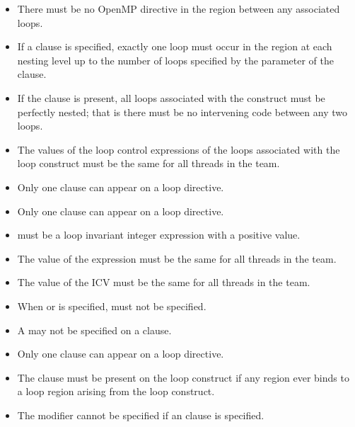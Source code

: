 \begin{itemize}
\item There must be no OpenMP directive in the region between any
associated loops.

\item If a  clause is specified, exactly one loop must
occur in the region at each nesting level up to the number of loops
specified by the parameter of the  clause.

\item If the  clause is present, all loops associated
with the construct must be perfectly nested; that is there must be
no intervening code between any two loops.

\item The values of the loop control expressions of the loops associated with the loop
construct must be the same for all threads in the team.

\item Only one  clause can appear on a loop directive.

\item Only one  clause can appear on a loop directive.

\item {} must be a loop invariant integer expression with a positive value.

\item The value of the  expression must be the same for all threads in the team.

\item The value of the  ICV must be the same for all threads in the team.

\item When  or  is specified,  must
not be specified.

\item A  may not be specified on a  clause.

\item Only one  clause can appear on a loop directive.

\item The  clause must be present on the loop construct if any  region
ever binds to a loop region arising from the loop construct.

\item The  modifier cannot be specified if an  clause is specified.


\end{itemize}
